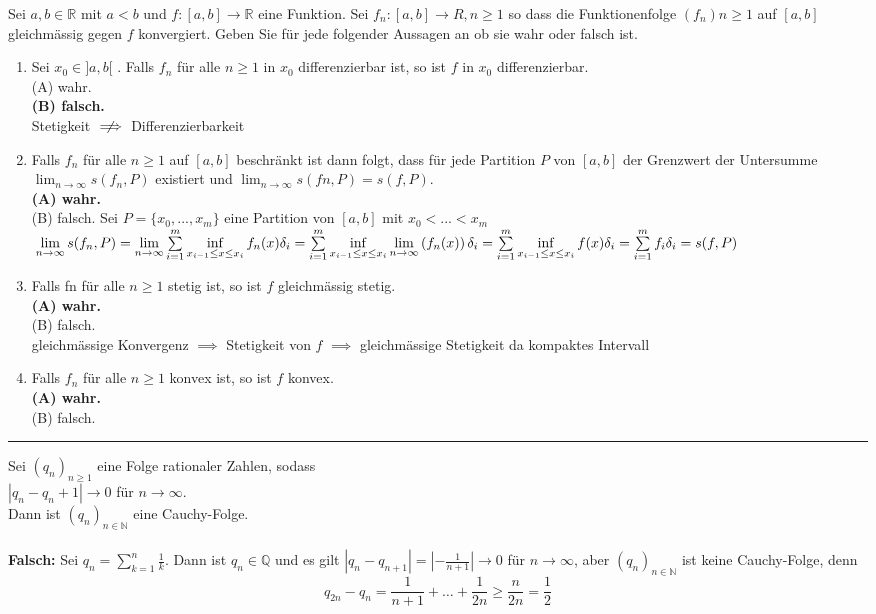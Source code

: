 \documentclass[a4paper,fontsize = 7pt]{scrartcl}
\def\limn{\lim_{n\to \infty}}
\def\R{\mathbb{R}}
\def\N{\mathbb{N}}
\begin{document}
Sei $a, b \in \R$ mit $a < b$ und $f : [a, b] \to \R$ eine Funktion. Sei $f_n : [a, b] \to R, n \geq 1$ so
dass die Funktionenfolge $(f_n)n \geq 1$ auf $[a, b]$ gleichmässig gegen $f$ konvergiert. Geben Sie
für jede folgender Aussagen an ob sie wahr oder falsch ist.
\begin{enumerate}
\item Sei $x_0 \in ]a, b[$ . Falls $f_n$ für alle $n \geq 1$ in $x_0$ differenzierbar ist, so ist $f$ in
$x_0$ differenzierbar.
\\(A) wahr.
\\\textbf{(B) falsch.}
\\ Stetigkeit $\centernot \implies$ Differenzierbarkeit
\item Falls $f_n$ für alle $n \geq 1$ auf $[a, b]$ beschränkt ist dann folgt, dass für jede
Partition $P$ von $[a, b]$ der Grenzwert der Untersumme $\limn s(f_n, P)$
 existiert und $\limn s(fn, P) = s(f, P)$.
\\\textbf{(A) wahr.}
\\(B) falsch.
Sei $P=\{x_0, ..., x_m\}$ eine Partition von $[a,b]$ mit $x_0 < ... < x_m$
$\\ \lim \limits_{n\to\infty}s(f_n,P)=\lim \limits_{n\to\infty} \sum\limits_{i=1}^{m}\inf\limits_{x_{i-1}\leq x\leq x_i}f_n(x) \delta_{i} =\sum\limits_{i=1}^{m}\inf\limits_{x_{i-1}\leq x\leq x_i}\lim \limits_{n\to\infty}\left(f_n(x)\right)\delta_{i}
\\=\sum\limits_{i=1}^{m}\inf\limits_{x_{i-1}\leq x\leq x_i}f(x)\delta_{i} =\sum\limits_{i=1}^{m}f_i \delta_i=s(f,P)$
\item Falls fn für alle $n \geq 1$ stetig ist, so ist $f$ gleichmässig stetig.
\\\textbf{(A) wahr.}
\\(B) falsch.
\\ gleichmässige Konvergenz $\implies$ Stetigkeit von $f$ $\implies$ gleichmässige Stetigkeit da kompaktes Intervall 
\item Falls $f_n$ für alle $n \geq 1$ konvex ist, so ist $f$ konvex.
\\\textbf{(A) wahr.}
\\(B) falsch.
\end{enumerate}

\vspace{0.1 cm}
\hrule
\vspace{0.2 cm}

Sei $(q_n)_{n \geq 1}$ eine Folge rationaler Zahlen, sodass
\\$|q_n - q_n+1| \to 0$ für $n \to \infty$.
\\Dann ist $(q_n)_{n \in \N}$ eine Cauchy-Folge.
 \\ 
\\\textbf{Falsch:} Sei $q_n = \sum_{k = 1}^n \frac{1}{k}$. Dann ist $q_n \in \mathbb{Q}$ und es gilt $|q_n - q_{n+1}| = |- \frac{1}{n+1}| \to 0$ für $n \to \infty$, 
aber $(q_n)_{n \in \N}$ ist keine Cauchy-Folge, denn $$q_{2n} - q_n = \frac{1}{n+1} + \dots + \frac{1}{2n} \geq \frac{n}{2n} = \frac{1}{2}$$
\end{document}
